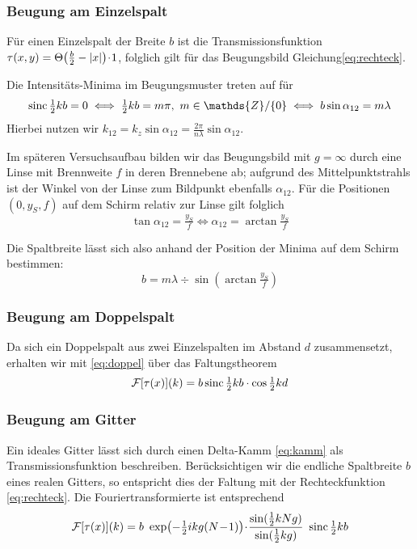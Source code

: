 \subsubsection*{Beugung am Einzelspalt}
Für einen Einzelspalt der Breite $b$ ist die Transmissionsfunktion $\tau(x,y) = \Theta\bigl(\tfrac{b}{2}-|x|\bigr) \!\cdot\! 1$, folglich gilt für das Beugungsbild Gleichung\eqref{eq:rechteck}.

Die Intensitäts-Minima im Beugungsmuster treten auf für 
\begin{equation}
\sinc \tfrac12 kb = 0
\iff \tfrac12 kb = m \pi,~ m \in \mathds{Z}/\{0\}
\iff b \sin \alpha_{12} = m \lambda
\end{equation}
Hierbei nutzen wir $k_{12} = k_z \sin \alpha_{12} = \frac{2 \pi}{n \lambda} \sin \alpha_{12}$.

Im späteren Versuchsaufbau bilden wir das Beugungsbild mit $g=\infty$ durch eine Linse mit Brennweite $f$ in deren Brennebene ab; aufgrund des Mittelpunktstrahls ist der Winkel von der Linse zum Bildpunkt ebenfalls $\alpha_{12}$. Für die Positionen $(0, y_S, f)$ auf dem Schirm relativ zur Linse gilt folglich
\begin{equation}
\tan \alpha_{12} = \tfrac{y_S}{f} 	\iff	 \alpha_{12} = \arctan \tfrac{y_S}{f}
\end{equation}

Die Spaltbreite lässt sich also anhand der Position der Minima auf dem Schirm bestimmen:
\begin{equation}
b = m \lambda \div \sin \left(\arctan \tfrac{y_S}{f}\right)
\label{eq:Messung}
\end{equation}

\subsubsection*{Beugung am Doppelspalt}
Da sich ein Doppelspalt aus zwei Einzelspalten im Abstand $d$ zusammensetzt, erhalten wir mit \eqref{eq:doppel} über das Faltungstheorem
\begin{equation}
\mathcal{F}[\tau(x)](k) =
b \operatorname{sinc} \tfrac12 kb \cdot \cos \tfrac12 kd
\end{equation}


\subsubsection*{Beugung am Gitter}
Ein ideales Gitter lässt sich durch einen Delta-Kamm \eqref{eq:kamm} als Transmissionsfunktion beschreiben. Berücksichtigen wir die endliche Spaltbreite $b$ eines realen Gitters, so entspricht dies der Faltung mit der Rechteckfunktion \eqref{eq:rechteck}.
Die Fouriertransformierte ist entsprechend
\begin{equation}
\mathcal{F}[\tau(x)](k) =
b ~ \exp \bigl(-\tfrac12 ikg(N\!-\!1) \bigr) \!\cdot\! \frac{\sin(\tfrac12 kNg)}{\sin(\tfrac12 kg)} ~ \operatorname{sinc} \tfrac12 kb
\end{equation}




%
%	
%	


